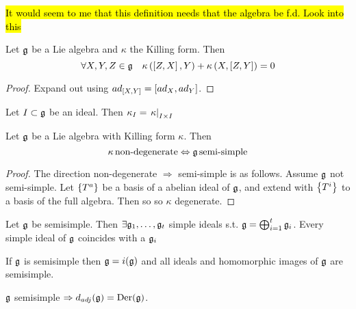 \documentclass{article}
\begin{document}
\begin{remark}
	\hl{It would seem to me that this definition needs that the algebra be f.d. Look into this}
\end{remark}

\begin{theorem}
	Let $\mf{g}$ be a Lie algebra and $\kappa$ the Killing form. Then
	\[
	\forall X,Y,Z\in\mf{g} \quad \kappa\left(\comm[Z]{X},Y\right)+\kappa\left(X,\comm[Z]{Y}\right)=0
	\]
\end{theorem}
\begin{proof}
	Expand out using $ad_{\comm[X]{Y}} = \comm[ad_X]{ad_Y}$. 
\end{proof}

\begin{lemma}
	Let $I \subset \mf{g}$ be an ideal. Then $\kappa_I = \ev{\kappa}{I \times I}$
\end{lemma}

\begin{theorem}[Cartan]
	Let $\mf{g}$ be a Lie algebra with Killing form $\kappa$. Then 
	\[
	\kappa \, \text{non-degenerate} \Leftrightarrow \mf{g} \, \text{semi-simple}
	\]
\end{theorem}
\begin{proof}
	The direction non-degenerate $\Rightarrow$ semi-simple is as follows. Assume $\mf{g}$ not semi-simple. Let $\pbrace{T^a}$ be a basis of a abelian ideal of $\mf{g}$, and extend with $\pbrace{T^i}$ to a basis of the full algebra. Then
	so
	so $\kappa$ degenerate. 
\end{proof}

\begin{theorem}
	Let $\mf{g}$ be semisimple. Then $\exists \mf{g}_1, \dots, \mf{g}_t$ simple ideals s.t. $\mf{g} = \bigoplus_{i=1}^t \mf{g}_i$. Every simple ideal of $\mf{g}$ coincides with a $\mf{g}_i$
\end{theorem}
\begin{corollary}
	If $\mf{g}$ is semisimple then $\mf{g} = i(\mf{g})$ and all ideals and homomorphic images of $\mf{g}$ are semisimple. 
\end{corollary}

\begin{theorem}
	$\mf{g}$ semisimple $\Rightarrow d_{adj}(\mf{g}) = \Der(\mf{g})$. 
\end{theorem}
\end{document}
